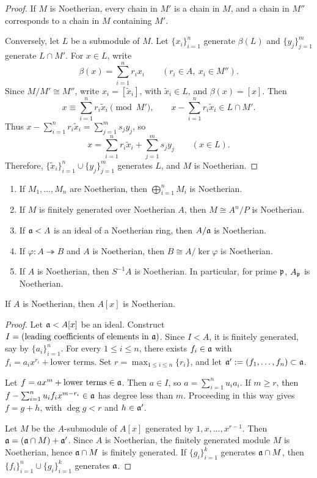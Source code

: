 \documentclass[11pt,a4paper]{article}
\begin{document}
\begin{proof}
If $M$ is Noetherian, every chain in $M'$ is a chain in $M$, and a chain in $M''$ corresponds to a chain in $M$ containing $M'$.

Conversely, let $L$ be a submodule of $M$. Let $\{x_i\}_{i=1}^n$ generate $\beta(L)$ and $\{y_j\}_{j=1}^m$ generate $L\cap M'$. For $x\in L$, write
\[\beta(x)=\sum_{i=1}^n r_i x_i\qquad(r_i\in A,\ x_i\in M'').\]
Since $M/M'\cong M''$, write $x_i=[\widetilde x_i]$, with $\widetilde x_i\in L$, and $\beta(x)=[x]$. Then
\[
x\equiv\sum_{i=1}^n r_i\widetilde x_i\pmod{M'},\qquad
x-\sum_{i=1}^n r_i\widetilde x_i\in L\cap M'.
\]
Thus $x-\sum_{i=1}^n r_i\widetilde x_i=\sum_{j=1}^m s_jy_j$, so
\[x=\sum_{i=1}^n r_i\widetilde x_i+\sum_{j=1}^m s_jy_j\qquad(x\in L).\]
Therefore, $\{\widetilde x_i\}_{i=1}^n\cup\{y_j\}_{j=1}^m$ generates $L$, and $M$ is Noetherian.
\end{proof}
\setcounter{theorem}{14}\begin{corollary}
\begin{enumerate}[label=(\roman*)]
\setcounter{enumi}{0}\item If $M_1,\ldots,M_n$ are Noetherian, then $\bigoplus_{i=1}^n M_i$ is Noetherian.
\setcounter{enumi}{1}\item If $M$ is finitely generated over Noetherian $A$, then $M\cong A^n/P$ is Noetherian.
\setcounter{enumi}{2}\item If $\aa<A$ is an ideal of a Noetherian ring, then $A/\aa$ is Noetherian.
\setcounter{enumi}{3}\item If $\varphi:A\twoheadrightarrow B$ and $A$ is Noetherian, then $B\cong A/\ker\varphi$ is Noetherian.
\setcounter{enumi}{4}\item If $A$ is Noetherian, then $S^{-1}A$ is Noetherian. In particular, for prime $\pp$, $A_{\pp}$ is Noetherian.
\end{enumerate}
\end{corollary}
\setcounter{theorem}{15}\begin{theorem}
If $A$ is Noetherian, then $A[x]$ is Noetherian.
\end{theorem}
\begin{proof}
Let $\aa<A[x]$ be an ideal. Construct $I=(\text{leading coefficients of elements in }\aa)$. Since $I<A$, it is finitely generated, say by $\{a_i\}_{i=1}^n$. For every $1\le i\le n$, there exists $f_i\in\aa$ with $f_i=a_ix^{r_i}+\text{lower terms}$. Set $r=\max_{1\le i\le n}\{r_i\}$, and let $\aa':=(f_1,\ldots,f_n)\subset\aa$.

Let $f=ax^m+\text{lower terms}\in\aa$. Then $a\in I$, so $a=\sum_{i=1}^n u_ia_i$. If $m\ge r$, then $f-\sum_{i=1}^n u_if_ix^{m-r_i}\in\aa$ has degree less than $m$. Proceeding in this way gives $f=g+h$, with $\deg g<r$ and $h\in\aa'$.

Let $M$ be the $A$-submodule of $A[x]$ generated by $1,x,\ldots,x^{r-1}$. Then $\aa=(\aa\cap M)+\aa'$. Since $A$ is Noetherian, the finitely generated module $M$ is Noetherian, hence $\aa\cap M$ is finitely generated. If $\{g_i\}_{i=1}^k$ generates $\aa\cap M$, then $\{f_i\}_{i=1}^n\cup\{g_i\}_{i=1}^k$ generates $\aa$.
\end{proof}
\end{document}
